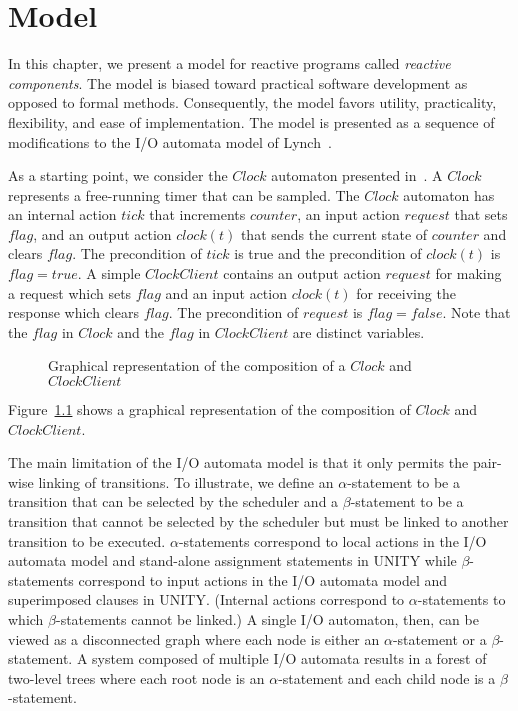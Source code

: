 \chapter{Model \label{model}}

In this chapter, we present a model for reactive programs called \emph{reactive components}.
The model is biased toward practical software development as opposed to formal methods.
Consequently, the model favors utility, practicality, flexibility, and ease of implementation.
The model is presented as a sequence of modifications to the I/O automata model of Lynch~\cite{nancy1996distributed}.

As a starting point, we consider the $Clock$ automaton presented in~\cite{nancy1996distributed}.
A $Clock$ represents a free-running timer that can be sampled.
The $Clock$ automaton has an internal action $tick$ that increments $counter$, an input action $request$ that sets $flag$, and an output action $clock(t)$ that sends the current state of $counter$ and clears $flag$.
The precondition of $tick$ is true and the precondition of $clock(t)$ is $flag = true$.
A simple $ClockClient$ contains an output action $request$ for making a request which sets $flag$ and an input action $clock(t)$ for receiving the response which clears $flag$.
The precondition of $request$ is $flag = false$.
Note that the $flag$ in $Clock$ and the $flag$ in $ClockClient$ are distinct variables.

\begin{figure}
{

\centerline{\box\graph}
}
\caption{Graphical representation of the composition of a $Clock$ and $ClockClient$\label{clock_automaton}}
\end{figure}

Figure~\ref{clock_automaton} shows a graphical representation of the composition of $Clock$ and $ClockClient$.




The main limitation of the I/O automata model is that it only permits the pair-wise linking of transitions.
To illustrate, we define an $\alpha$-statement to be a transition that can be selected by the scheduler and a $\beta$-statement to be a transition that cannot be selected by the scheduler but must be linked to another transition to be executed.
$\alpha$-statements correspond to local actions in the I/O automata model and stand-alone assignment statements in UNITY while $\beta$-statements correspond to input actions in the I/O automata model and superimposed clauses in UNITY.
(Internal actions correspond to $\alpha$-statements to which $\beta$-statements cannot be linked.)
A single I/O automaton, then, can be viewed as a disconnected graph where each node is either an $\alpha$-statement or a $\beta$-statement.
A system composed of multiple I/O automata results in a forest of two-level trees where each root node is an $\alpha$-statement and each child node is a $\beta$-statement.




